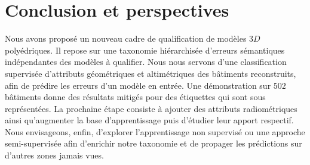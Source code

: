 \documentclass[a4paper,french]{article}
\begin{document}
    \section{Conclusion et perspectives}

    Nous avons proposé un nouveau cadre de qualification de modèles $3D$ polyédriques. Il repose sur une taxonomie hiérarchisée d'erreurs sémantiques indépendantes des modèles à qualifier. Nous nous servons d'une classification supervisée d'attributs géométriques et altimétriques des bâtiments reconstruits, afin de prédire les erreurs d'un modèle en entrée. Une démonstration sur $502$ bâtiments donne des résultats mitigés pour des étiquettes qui sont sous représentées. La prochaine étape consiste à ajouter des attributs radiométriques ainsi qu'augmenter la base d'apprentissage puis d'étudier leur apport respectif. Nous envisageons, enfin, d'explorer l'apprentissage non supervisé ou une approche semi-supervisée afin d'enrichir notre taxonomie et de propager les prédictions sur d'autres zones jamais vues.

    
    
\end{document}
